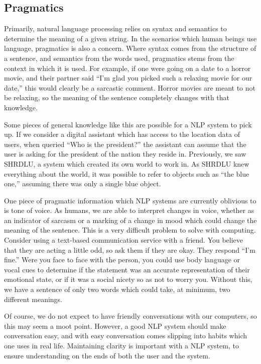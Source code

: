 \subsection{Pragmatics}
Primarily, natural language processing relies on syntax and semantics to determine the meaning of a given string. In the scenarios which human beings use language, pragmatics is also a concern. Where syntax comes from the structure of a sentence, and semantics from the words used, pragmatics stems from the context in which it is used. For example, if one were going on a date to a horror movie, and their partner said ``I'm glad you picked such a relaxing movie for our date,'' this would clearly be a sarcastic comment. Horror movies are meant to not be relaxing, so the meaning of the sentence completely changes with that knowledge.

Some pieces of general knowledge like this are possible for a NLP system to pick up. If we consider a digital assistant which has access to the location data of users, when queried ``Who is the president?'' the assistant can assume that the user is asking for the president of the nation they reside in. Previously, we saw SHRDLU, a system which created its own world to work in. As SHRDLU knew everything about the world, it was possible to refer to objects such as ``the blue one,'' assuming there was only a single blue object.

One piece of pragmatic information which NLP systems are currently oblivious to is tone of voice. As humans, we are able to interpret changes in voice, whether as an indicator of sarcasm or a marking of a change in mood which could change the meaning of the sentence. This is a very difficult problem to solve with computing. Consider using a text-based communication service with a friend. You believe that they are acting a little odd, so ask them if they are okay. They respond ``I'm fine.'' Were you face to face with the person, you could use body language or vocal cues to determine if the statement was an accurate representation of their emotional state, or if it was a social nicety so as not to worry you. Without this, we have a sentence of only two words which could take, at minimum, two different meanings.

Of course, we do not expect to have friendly conversations with our computers, so this may seem a moot point. However, a good NLP system should make conversation easy, and with easy conversation comes slipping into habits which one uses in real life. Maintaining clarity is important with a NLP system, to ensure understanding on the ends of both the user and the system.


